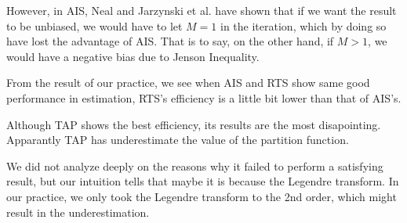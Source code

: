 However, in AIS, Neal and Jarzynski et al.\cite{neal2001annealed,nonequilibrium} have shown that if we want the result to be unbiased, we would have to let $M=1$ in the iteration, which by doing so have lost the advantage of AIS. That is to say, on the other hand, if $M > 1$, we would have a negative bias due to Jenson Inequality.

From the result of our practice, we see when AIS and RTS show same good performance in estimation, RTS's efficiency is a little bit lower than that of AIS's.

Although TAP shows the best efficiency, its results are the most disapointing. Apparantly TAP has underestimate the value of the partition function.

We did not analyze deeply on the reasons why it failed to perform a satisfying result, but our intuition tells that maybe it is because the Legendre transform. In our practice, we only took the Legendre transform to the 2nd order, which might result in the underestimation.
